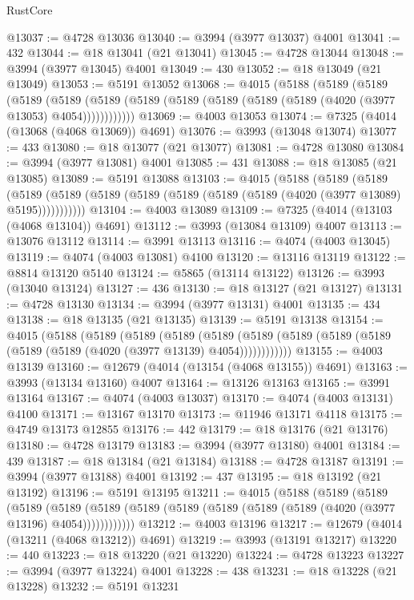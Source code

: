 \begin{lexlean}{RustCore}
\begin{coremodule}
@13037 := @4728 @13036
@13040 := @3994 (@3977 @13037) @4001
@13041 := 432
@13044 := @18 @13041 (@21 @13041)
@13045 := @4728 @13044
@13048 := @3994 (@3977 @13045) @4001
@13049 := 430
@13052 := @18 @13049 (@21 @13049)
@13053 := @5191 @13052
@13068 := @4015
    (@5188
      (@5189
        (@5189
          (@5189
            (@5189 (@5189 (@5189 (@5189 (@5189 (@5189 (@5189 (@4020 (@3977 @13053) @4054))))))))))))
@13069 := @4003 @13053
@13074 := @7325 (@4014 (@13068 (@4068 @13069)) @4691)
@13076 := @3993 (@13048 @13074)
@13077 := 433
@13080 := @18 @13077 (@21 @13077)
@13081 := @4728 @13080
@13084 := @3994 (@3977 @13081) @4001
@13085 := 431
@13088 := @18 @13085 (@21 @13085)
@13089 := @5191 @13088
@13103 := @4015
    (@5188
      (@5189
        (@5189
          (@5189 (@5189 (@5189 (@5189 (@5189 (@5189 (@5189 (@4020 (@3977 @13089) @5195)))))))))))
@13104 := @4003 @13089
@13109 := @7325 (@4014 (@13103 (@4068 @13104)) @4691)
@13112 := @3993 (@13084 @13109) @4007
@13113 := @13076 @13112
@13114 := @3991 @13113
@13116 := @4074 (@4003 @13045)
@13119 := @4074 (@4003 @13081) @4100
@13120 := @13116 @13119
@13122 := @8814 @13120 @5140
@13124 := @5865 (@13114 @13122)
@13126 := @3993 (@13040 @13124)
@13127 := 436
@13130 := @18 @13127 (@21 @13127)
@13131 := @4728 @13130
@13134 := @3994 (@3977 @13131) @4001
@13135 := 434
@13138 := @18 @13135 (@21 @13135)
@13139 := @5191 @13138
@13154 := @4015
    (@5188
      (@5189
        (@5189
          (@5189
            (@5189 (@5189 (@5189 (@5189 (@5189 (@5189 (@5189 (@4020 (@3977 @13139) @4054))))))))))))
@13155 := @4003 @13139
@13160 := @12679 (@4014 (@13154 (@4068 @13155)) @4691)
@13163 := @3993 (@13134 @13160) @4007
@13164 := @13126 @13163
@13165 := @3991 @13164
@13167 := @4074 (@4003 @13037)
@13170 := @4074 (@4003 @13131) @4100
@13171 := @13167 @13170
@13173 := @11946 @13171 @4118
@13175 := @4749 @13173 @12855
@13176 := 442
@13179 := @18 @13176 (@21 @13176)
@13180 := @4728 @13179
@13183 := @3994 (@3977 @13180) @4001
@13184 := 439
@13187 := @18 @13184 (@21 @13184)
@13188 := @4728 @13187
@13191 := @3994 (@3977 @13188) @4001
@13192 := 437
@13195 := @18 @13192 (@21 @13192)
@13196 := @5191 @13195
@13211 := @4015
    (@5188
      (@5189
        (@5189
          (@5189
            (@5189 (@5189 (@5189 (@5189 (@5189 (@5189 (@5189 (@4020 (@3977 @13196) @4054))))))))))))
@13212 := @4003 @13196
@13217 := @12679 (@4014 (@13211 (@4068 @13212)) @4691)
@13219 := @3993 (@13191 @13217)
@13220 := 440
@13223 := @18 @13220 (@21 @13220)
@13224 := @4728 @13223
@13227 := @3994 (@3977 @13224) @4001
@13228 := 438
@13231 := @18 @13228 (@21 @13228)
@13232 := @5191 @13231

\end{coremodule}
\end{lexlean}
